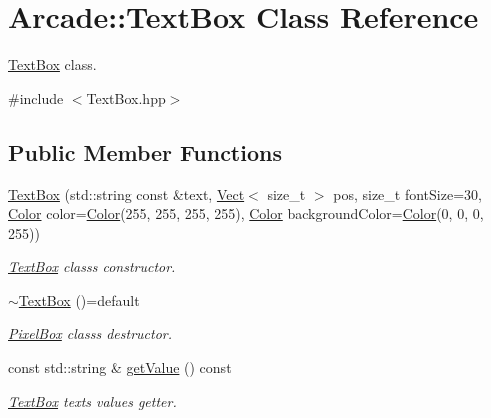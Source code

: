 \hypertarget{class_arcade_1_1_text_box}{}\section{Arcade\+:\+:Text\+Box Class Reference}
\label{class_arcade_1_1_text_box}


\hyperlink{class_arcade_1_1_text_box}{Text\+Box} class.  




{\ttfamily \#include $<$Text\+Box.\+hpp$>$}

\subsection*{Public Member Functions}
\begin{DoxyCompactItemize}
\item 
\hyperlink{class_arcade_1_1_text_box_ad906f51406be8703146d7fe4eac0a7df}{Text\+Box} (std\+::string const \&text, \hyperlink{class_arcade_1_1_vect}{Vect}$<$ size\+\_\+t $>$ pos, size\+\_\+t font\+Size=30, \hyperlink{class_arcade_1_1_color}{Color} color=\hyperlink{class_arcade_1_1_color}{Color}(255, 255, 255, 255), \hyperlink{class_arcade_1_1_color}{Color} background\+Color=\hyperlink{class_arcade_1_1_color}{Color}(0, 0, 0, 255))
\begin{DoxyCompactList}\small\item\em \hyperlink{class_arcade_1_1_text_box}{Text\+Box} class\textquotesingle{}s constructor. \end{DoxyCompactList}\item 
\mbox{\label{class_arcade_1_1_text_box_a8c3f24e683f3ed4a0b26dfb058077fca}} 
\hyperlink{class_arcade_1_1_text_box_a8c3f24e683f3ed4a0b26dfb058077fca}{$\sim$\+Text\+Box} ()=default
\begin{DoxyCompactList}\small\item\em \hyperlink{class_arcade_1_1_pixel_box}{Pixel\+Box} class\textquotesingle{}s destructor. \end{DoxyCompactList}\item 
const std\+::string \& \hyperlink{class_arcade_1_1_text_box_a08d2b7ad04db74670557a2136db06add}{get\+Value} () const
\begin{DoxyCompactList}\small\item\em \hyperlink{class_arcade_1_1_text_box}{Text\+Box} text\textquotesingle{}s value\textquotesingle{}s getter. \end{DoxyCompactList}\item 

\end{DoxyCompactItemize}

